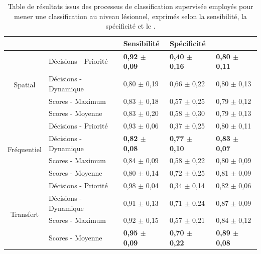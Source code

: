 \begin{table}[H]
    \centering
    \begin{tabular}{cllll}
        \toprule
        \multicolumn{1}{l}{}         &                              & Sensibilité               & Spécificité               & \Fscore{}                 \\ \midrule
        \multirow{4}{*}{Spatial}     & Décisions - Priorité         & \textbf{0,92 $\pm$ 0,09}    & \textbf{0,40 $\pm$ 0,16}    & \textbf{0,80 $\pm$ 0,11}    \\
                                     & Décisions - Dynamique        & 0,80 $\pm$ 0,19             & 0,66 $\pm$ 0,22             & 0,80 $\pm$ 0,13             \\
                                     & Scores - Maximum             & 0,83 $\pm$ 0,18             & 0,57 $\pm$ 0,25             & 0,79 $\pm$ 0,12             \\
                                     & Scores - Moyenne             & 0,83 $\pm$ 0,20             & 0,58 $\pm$ 0,30             & 0,79 $\pm$ 0,13             \\ \midrule
        \multirow{4}{*}{Fréquentiel} & Décisions - Priorité         & 0,93 $\pm$ 0,06             & 0,37 $\pm$ 0,25             & 0,80 $\pm$ 0,11             \\
                                     & Décisions - Dynamique        & \textbf{0,82 $\pm$ 0,08}    & \textbf{0,77 $\pm$ 0,10}    & \textbf{0,83 $\pm$ 0,07}    \\
                                     & Scores - Maximum             & 0,84 $\pm$ 0,09             & 0,58 $\pm$ 0,22             & 0,80 $\pm$ 0,09             \\
                                     & Scores - Moyenne             & 0,80 $\pm$ 0,14             & 0,72 $\pm$ 0,25             & 0,81 $\pm$ 0,09             \\ \midrule
        \multirow{4}{*}{Transfert}   & Décisions - Priorité         & 0,98 $\pm$ 0,04             & 0,34 $\pm$ 0,14             & 0,82 $\pm$ 0,06             \\
                                     & Décisions - Dynamique        & 0,91 $\pm$ 0,13             & 0,71 $\pm$ 0,24             & 0,87 $\pm$ 0,09             \\
                                     & Scores - Maximum             & 0,92 $\pm$ 0,15             & 0,57 $\pm$ 0,21             & 0,84 $\pm$ 0,12             \\
                                     & Scores - Moyenne             & \textbf{0,95 $\pm$ 0,09}    & \textbf{0,70 $\pm$ 0,22}    & \textbf{0,89 $\pm$ 0,08}    \\ \bottomrule
    \end{tabular}
    \caption{Table de résultats issus des processus de classification supervisée employés pour mener une classification au niveau lésionnel, exprimés selon la sensibilité, la spécificité et le \fscore{}.}
    \label{tab:results_lesion_classification_supervised_patient}
\end{table}

